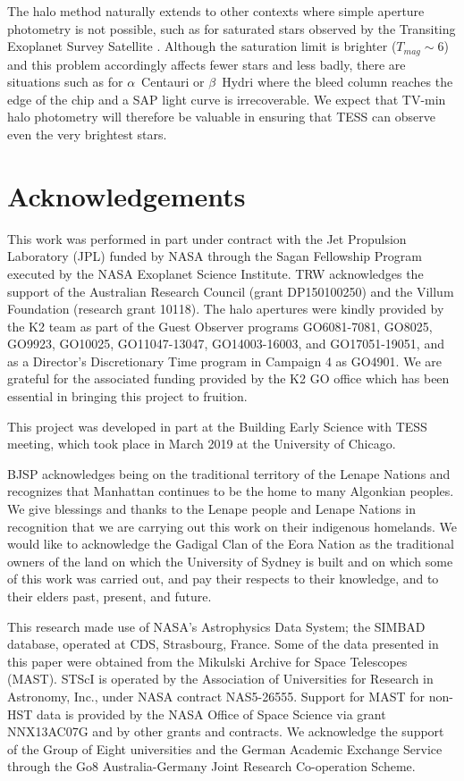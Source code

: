 \documentclass[modern]{aastex62}
\begin{document}
The halo method naturally extends to other contexts where simple aperture photometry is not possible, such as for saturated stars observed by the Transiting Exoplanet Survey Satellite \citep[TESS;][]{tess}. Although the saturation limit is brighter ($T_{mag} \sim 6$) and this problem accordingly affects fewer stars and less badly, there are situations such as for $\alpha$~Centauri or $\beta$~Hydri where the bleed column reaches the edge of the chip and a SAP light curve is irrecoverable. We expect that TV-min halo photometry will therefore be valuable in ensuring that TESS can observe even the very brightest stars.

\section*{Acknowledgements} %

This work was performed in part under contract with the Jet Propulsion Laboratory (JPL) funded by NASA through the Sagan Fellowship Program executed by the NASA Exoplanet Science Institute. TRW acknowledges the support of the Australian Research Council (grant DP150100250) and the Villum Foundation (research grant 10118). The halo apertures were kindly provided by the K2 team as part of the Guest Observer programs GO6081-7081, GO8025, GO9923, GO10025, GO11047-13047, GO14003-16003, and GO17051-19051, and as a Director's Discretionary Time program in Campaign 4 as GO4901. We are grateful for the associated funding provided by the K2 GO office which has been essential in bringing this project to fruition.

This project was developed in part at the Building Early Science with TESS meeting, which took place in March 2019 at the University of Chicago.

BJSP acknowledges being on the traditional territory of the Lenape Nations and recognizes that Manhattan continues to be the home to many Algonkian peoples. We give blessings and thanks to the Lenape people and Lenape Nations in recognition that we are carrying out this work on their indigenous homelands. We would like to acknowledge the Gadigal Clan of the Eora Nation as the traditional owners of the land on which the University of Sydney is built and on which some of this work was carried out, and pay their respects to their knowledge, and to their elders past, present, and future.
%

This research made use of NASA's Astrophysics Data System; the SIMBAD database, operated at CDS, Strasbourg, France. Some of the data presented in this paper were obtained from the Mikulski Archive for Space Telescopes (MAST). STScI is operated by the Association of Universities for Research in Astronomy, Inc., under NASA contract NAS5-26555. Support for MAST for non-HST data is provided by the NASA Office of Space Science via grant NNX13AC07G and by other grants and contracts. We acknowledge the support of the Group of Eight universities and the German Academic Exchange Service through the Go8 Australia-Germany Joint Research Co-operation Scheme. 
\end{document}
